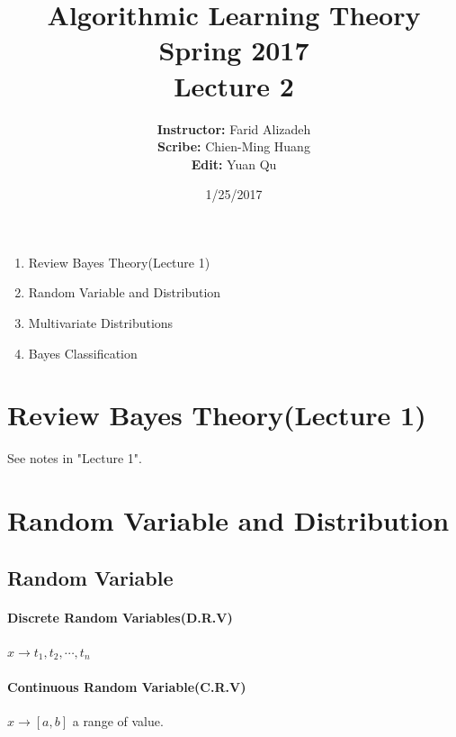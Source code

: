 \documentclass{article}
\title{ 
    Algorithmic Learning Theory\\
    Spring 2017\\
    Lecture 2 %
}
\author{
    {\bf Instructor: } Farid Alizadeh\\
    {\bf Scribe: } Chien-Ming Huang\\
    {\bf Edit: } Yuan Qu\\
}
\date{1/25/2017} %
\begin{document}
\pagestyle{fancy}

\maketitle
%


\medskip
\begin{enumerate}
    \item Review Bayes Theory(Lecture 1) 
    \item Random Variable and Distribution
    \item Multivariate Distributions
    \item Bayes Classification
\end{enumerate}

\section{Review Bayes Theory(Lecture 1)}
See notes in "Lecture 1".
\section{Random Variable and Distribution} 
    \subsection{Random Variable}{
        \paragraph{Discrete Random Variables(D.R.V)}{
            $ x\rightarrow t_1, t_2, \cdots, t_n$
        }
        \paragraph{Continuous Random Variable(C.R.V)}{
            $ x\rightarrow [a, b]$ a range of value.
        }
    }
\end{document}

